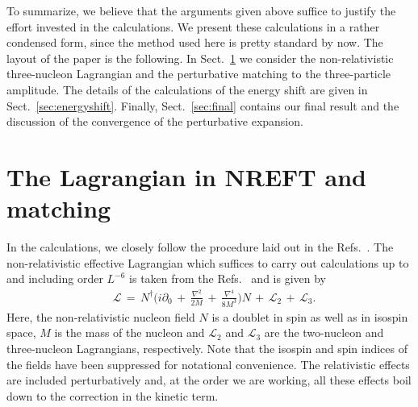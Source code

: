 \documentclass[12pt,prd,tightenlines,nofootinbib]{revtex4-2}
\begin{document}
To summarize, we believe that the arguments given above suffice to
justify the effort invested
in the calculations. We present these calculations in a rather condensed form, since
the method used here is pretty standard by now. The layout of the paper is the following.
In Sect.~\ref{sec:matching} we consider the non-relativistic three-nucleon Lagrangian
and the perturbative matching to the three-particle amplitude. The details of the calculations
of the energy shift are given in Sect.~\ref{sec:energyshift}. Finally,
Sect.~\ref{sec:final} contains our final result and the discussion of the
convergence of the perturbative expansion.





\section{The Lagrangian in NREFT and matching}
\label{sec:matching}
In the calculations, we closely follow the procedure laid out in the
Refs.~\cite{Romero-Lopez:2020rdq,Beane:2007qr,Muller:2020vtt}.
The non-relativistic effective Lagrangian which suffices to carry out calculations
up to and including order $L^{-6}$
is taken from the Refs.~\cite{Chen:1999tn,Bedaque:1999ve} and is given by
\begin{align}\label{eq:L_full}
    &\mathscr{L} \, = \, N^{\dagger} \Big( i\partial_{0}\, + \, \frac{\nabla^2}{2M}\, +\, \frac{\nabla^4}{8M^3}\Big)N\, + \, \mathscr{L}_{2}\,+\, \mathscr{L}_{3}.
\end{align}
Here, the non-relativistic nucleon field $N$ is a doublet in spin as well as in isospin space,
$M$ is the mass of the nucleon and $\mathscr{L}_{2}$ and $\mathscr{L}_{3}$
are the two-nucleon and three-nucleon Lagrangians, respectively. Note that
the isospin and spin indices of the fields have been suppressed for notational
convenience. The relativistic effects are included perturbatively and, at the order we
are working, all these effects boil down to the correction in the kinetic term.
\end{document}
